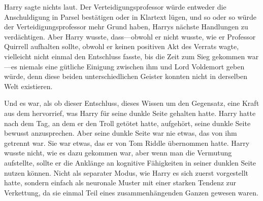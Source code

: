 Harry sagte nichts laut. Der Verteidigungsprofessor würde entweder die Anschuldigung in Parsel bestätigen oder in Klartext lügen, und so oder so würde der Verteidigungsprofessor mehr Grund haben, Harrys nächste Handlungen zu verdächtigen. Aber Harry wusste, dass—obwohl er nicht wusste, wie er Professor Quirrell aufhalten sollte, obwohl er keinen positiven Akt des Verrats wagte, vielleicht nicht einmal den Entschluss fasste, bis die Zeit zum Sieg gekommen war—es niemals eine gütliche Einigung zwischen ihm und Lord Voldemort geben würde, denn diese beiden unterschiedlichen Geister konnten nicht in derselben Welt existieren.

Und es war, als ob dieser Entschluss, dieses Wissen um den Gegensatz, eine Kraft aus dem hervorrief, was Harry für seine dunkle Seite gehalten hatte. Harry hatte nach dem Tag, an dem er den Troll getötet hatte, aufgehört, seine dunkle Seite bewusst anzusprechen. Aber seine dunkle Seite war nie etwas, das von ihm getrennt war. Sie war etwas, das er von Tom Riddle übernommen hatte. Harry wusste nicht, wie es dazu gekommen war, aber wenn man die Vermutung aufstellte, sollte er die Anklänge an kognitive Fähigkeiten in seiner dunklen Seite nutzen können. Nicht als separater Modus, wie Harry es sich zuerst vorgestellt hatte, sondern einfach als neuronale Muster mit einer starken Tendenz zur Verkettung, da sie einmal Teil eines zusammenhängenden Ganzen gewesen waren.


